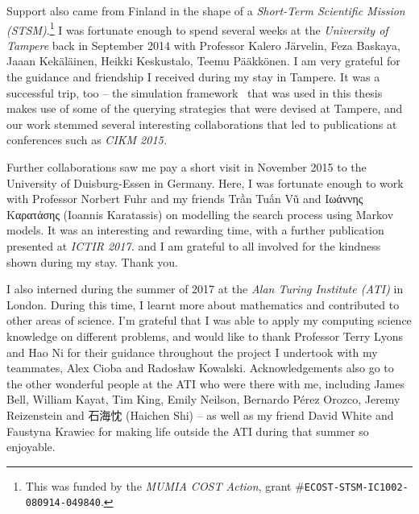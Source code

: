 \begin{preamble}
Support also came from Finland in the shape of a \emph{Short-Term Scientific Mission (STSM)}.\footnote{This was funded by the \emph{MUMIA COST Action}, grant \#\texttt{ECOST-STSM-IC1002-080914-049840}.} I was fortunate enough to spend several weeks at the \emph{University of Tampere} back in September 2014 with Professor Kalero J\"{a}rvelin, Feza Baskaya, Jaaan Kek\"{a}l\"{a}inen, Heikki Keskustalo, Teemu P\"{a}\"{a}kk\"{o}nen. I am very grateful for the guidance and friendship I received during my stay in Tampere. It was a successful trip, too -- the simulation framework \simiir~that was used in this thesis makes use of some of the querying strategies that were devised at Tampere, and our work stemmed several interesting collaborations that led to publications at conferences such as \emph{CIKM 2015.}

Further collaborations saw me pay a short visit in November 2015 to the University of Duisburg-Essen in Germany. Here, I was fortunate enough to work with Professor Norbert Fuhr and my friends Trần Tuấn Vũ and Ιωάννης Καρατάσης (Ioannis Karatassis) on modelling the search process using Markov models. It was an interesting and rewarding time, with a further publication presented at \emph{ICTIR 2017.} and I am grateful to all involved for the kindness shown during my stay. Thank you.

I also interned during the summer of 2017 at the \emph{Alan Turing Institute (ATI)} in London. During this time, I learnt more about mathematics and contributed to other areas of science. I'm grateful that I was able to apply my computing science knowledge on different problems, and would like to thank Professor Terry Lyons and Hao Ni for their guidance throughout the project I undertook with my teammates, Alex Cioba and Rados\l{}aw Kowalski. Acknowledgements also go to the other wonderful people at the ATI who were there with me, including James Bell, William Kayat, Tim King, Emily Neilson, Bernardo P\'{e}rez Orozco, Jeremy Reizenstein and {\asianfont 石海忱} (Haichen Shi) -- as well as my friend David White and Faustyna Krawiec for making life outside the ATI during that summer so enjoyable.


\end{preamble}
